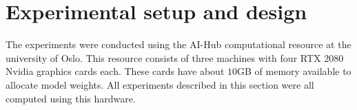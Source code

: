 \section{Experimental setup and design}

The experiments were conducted using the AI-Hub computational resource at the university of Oslo.  This resource consists of three machines with four RTX $2080$ Nvidia graphics cards each. These cards have about $10$GB of memory available to allocate model weights. All experiments described in this section were all computed using this hardware.   